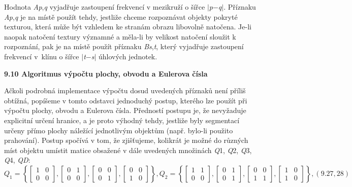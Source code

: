 Hodnota \textit{Ap},\textit{q} vyjadřuje zastoupení frekvencí v mezikruží o šířce  $\mid$\textit{p}$-$\textit{q}$\mid$.  Příznaku \textit{Ap},\textit{q} je na místě použít tehdy, jestliže chceme rozpoznávat objekty pokryté texturou, která může být vzhledem ke stranám obrazu libovolně natočena. Je-li naopak natočení textury významné a měla-li by velikost natočení sloužit k rozpoznání, pak je na místě použít příznaku \textit{Bs},\textit{t}, který vyjadřuje zastoupení frekvencí v~klínu o šířce $\mid$\textit{t}$-$\textit{s}$\mid$ úhlových jednotek.

\noindent \textbf{9.10  Algoritmus výpočtu plochy, obvodu a Eulerova čísla}

\noindent Ačkoli podrobná implementace výpočtu dosud uvedených příznaků není příliš obtížná, popíšeme v tomto odstavci jednoduchý postup, kterého lze použít při výpočtu plochy, obvodu a Eulerova čísla. Předností postupu je, že nevyžaduje explicitní určení hranice, a je proto výhodný tehdy, jestliže byly segmentací určeny přímo plochy náležící jednotlivým objektům (např. bylo-li použito prahování). Postup spočívá v tom, že zjišťujeme, kolikrát je možné do různých míst objektu umístit matice obsažené v dále uvedených množinách \textit{Q}1, \textit{Q}2, \textit{Q}3, \textit{Q}4, \textit{QD}:
\[Q_{1} =\left\{\left[\begin{array}{cc} {1} & {0} \\ {0} & {0} \end{array}\right],\left[\begin{array}{cc} {0} & {1} \\ {0} & {0} \end{array}\right],\left[\begin{array}{cc} {0} & {0} \\ {0} & {1} \end{array}\right],\left[\begin{array}{cc} {0} & {0} \\ {1} & {0} \end{array}\right]\right\},   Q_{2} =\left\{\left[\begin{array}{cc} {1} & {1} \\ {0} & {0} \end{array}\right],\left[\begin{array}{cc} {0} & {1} \\ {0} & {1} \end{array}\right],\left[\begin{array}{cc} {0} & {0} \\ {1} & {1} \end{array}\right],\left[\begin{array}{cc} {1} & {0} \\ {1} & {0} \end{array}\right]\right\}, (9.27, 28)\] 

